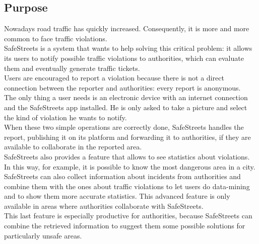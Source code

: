 \documentclass{article}
\begin{document}
		\subsection{Purpose}
		Nowadays road traffic has quickly increased. Consequently, it is more and more common to face traffic violations.\\
		SafeStreets is a system that wants to help solving this critical problem: it allows its users to notify possible traffic violations to authorities, which can evaluate them and eventually generate traffic tickets.\\
		Users are encouraged to report a violation because there is not a direct connection between the reporter and authorities: every report is anonymous.\\
		The only thing a user needs is an electronic device with an internet connection and the SafeStreets app installed. He is only asked to take a picture and select the kind of violation he wants to notify.\\
		When these two simple operations are correctly done, SafeStreets handles the report, publishing it on its platform and forwarding it to authorities, if they are available to collaborate in the reported area.\\
		SafeStreets also provides a feature that allows to see statistics about violations. In this way, for example, it is possible to know the most dangerous area in a city.\\
		SafeStreets can also collect information about incidents from authorities and combine them with the ones about traffic violations to let users do data-mining and to show them more accurate statistics. This advanced feature is only available in areas where authorities collaborate with SafeStreets.\\
		This last feature is especially productive for authorities, because SafeStreets can combine the retrieved information to suggest them some possible solutions for particularly unsafe areas.\\
	
\end{document}
